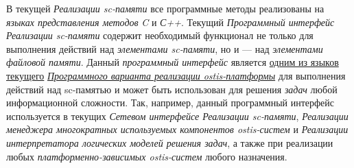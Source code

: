 \begin{SCn}
\begin{scnsubstruct}
\begin{scnsubstruct}
\begin{scnsubstruct}
\begin{scnsubstruct}
{	В текущей \textit{Реализации sc-памяти} все программные методы реализованы на \textit{языках представления методов} \textit{C} и \textit{С++}. Текущий \textit{Программный интерфейс Реализации sc-памяти} содержит необходимый функционал не только для выполнения действий над \textit{элементами sc-памяти}, но и --- над \textit{элементами файловой памяти}. Данный \textit{программный интерфейс} является \uline{одним из языков текущего} \uline{\textit{Программного варианта реализации ostis-платформы}} для выполнения действий над sc-памятью и может быть использован для решения \textit{задач} любой информационной сложности. Так, например, данный программный интерфейс используется в текущих \textit{Сетевом интерфейсе Реализации sc-памяти}, \textit{Реализации менеджера многократных используемых компонентов ostis-систем} и \textit{Реализации интерпретатора логических моделей решения задач}, а также при реализации любых \textit{платформенно-зависимых ostis-систем} любого назначения.}
		

\end{scnsubstruct}
\end{scnsubstruct}
\end{scnsubstruct}
\end{scnsubstruct}
\end{SCn}
